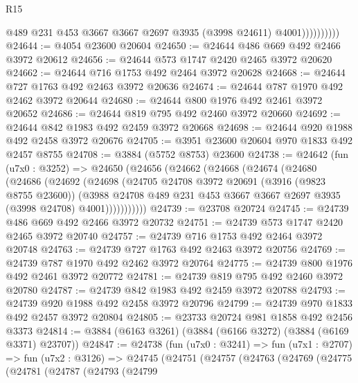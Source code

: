 \begin{lexlean}{R15}
\begin{coremodule}
                        @489
                        @231
                        @453
                        @3667
                        @3667
                        @2697
                        @3935
                        (@3998 @24611)
                        @4001))))))))))
@24644 := @4054 @23600 @20604
@24650 := @24644 @486 @669 @492 @2466 @3972 @20612
@24656 := @24644 @573 @1747 @2420 @2465 @3972 @20620
@24662 := @24644 @716 @1753 @492 @2464 @3972 @20628
@24668 := @24644 @727 @1763 @492 @2463 @3972 @20636
@24674 := @24644 @787 @1970 @492 @2462 @3972 @20644
@24680 := @24644 @800 @1976 @492 @2461 @3972 @20652
@24686 := @24644 @819 @795 @492 @2460 @3972 @20660
@24692 := @24644 @842 @1983 @492 @2459 @3972 @20668
@24698 := @24644 @920 @1988 @492 @2458 @3972 @20676
@24705 := @3951 @23600 @20604 @970 @1833 @492 @2457 @8755
@24708 := @3884 (@5752 @8753) @23600
@24738 := @24642
    (fun (u7x0 : @3252) =>
    @24650
      (@24656
        (@24662
          (@24668
            (@24674
              (@24680
                (@24686
                  (@24692
                    (@24698
                      (@24705
                        @24708
                        @3972
                        @20691
                        (@3916 (@9823 @8755 @23600))
                        (@3988
                          @24708
                          @489
                          @231
                          @453
                          @3667
                          @3667
                          @2697
                          @3935
                          (@3998 @24708)
                          @4001)))))))))))
@24739 := @23708 @20724
@24745 := @24739 @486 @669 @492 @2466 @3972 @20732
@24751 := @24739 @573 @1747 @2420 @2465 @3972 @20740
@24757 := @24739 @716 @1753 @492 @2464 @3972 @20748
@24763 := @24739 @727 @1763 @492 @2463 @3972 @20756
@24769 := @24739 @787 @1970 @492 @2462 @3972 @20764
@24775 := @24739 @800 @1976 @492 @2461 @3972 @20772
@24781 := @24739 @819 @795 @492 @2460 @3972 @20780
@24787 := @24739 @842 @1983 @492 @2459 @3972 @20788
@24793 := @24739 @920 @1988 @492 @2458 @3972 @20796
@24799 := @24739 @970 @1833 @492 @2457 @3972 @20804
@24805 := @23733 @20724 @981 @1858 @492 @2456 @3373
@24814 := @3884 (@6163 @3261) (@3884 (@6166 @3272) (@3884 (@6169 @3371) @23707))
@24847 := @24738
    (fun (u7x0 : @3241) =>
    fun (u7x1 : @2707) =>
    fun (u7x2 : @3126) =>
    @24745
      (@24751
        (@24757
          (@24763
            (@24769
              (@24775
                (@24781
                  (@24787
                    (@24793
                      (@24799

\end{coremodule}
\end{lexlean}
